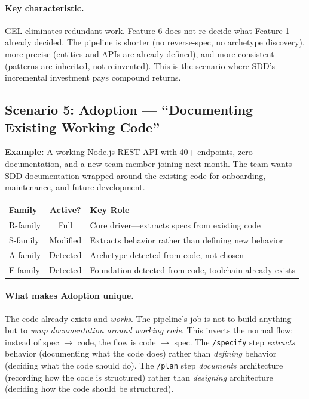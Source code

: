 \documentclass[11pt,a4paper,openright,twoside]{report}
\newcommand{\cmd}[1]{\texttt{/#1}}
\begin{document}
\paragraph{Key characteristic.}
GEL eliminates redundant work. Feature 6 does not re-decide what Feature 1 already decided. The pipeline is shorter (no reverse-spec, no archetype discovery), more precise (entities and APIs are already defined), and more consistent (patterns are inherited, not reinvented). This is the scenario where SDD's incremental investment pays compound returns.

\subsection{Scenario 5: Adoption --- ``Documenting Existing Working Code''}
\label{sec:scenario-adoption}

\textbf{Example:} A working Node.js REST API with 40+ endpoints, zero documentation, and a new team member joining next month. The team wants SDD documentation wrapped around the existing code for onboarding, maintenance, and future development.

\begin{center}
\begin{tabular}{lcp{8cm}}
\toprule
\textbf{Family} & \textbf{Active?} & \textbf{Key Role} \\
\midrule
R-family & Full & Core driver---extracts specs from existing code \\
S-family & Modified & Extracts behavior rather than defining new behavior \\
A-family & Detected & Archetype detected from code, not chosen \\
F-family & Detected & Foundation detected from code, toolchain already exists \\
\bottomrule
\end{tabular}
\end{center}

\paragraph{What makes Adoption unique.}
The code already exists and \emph{works}. The pipeline's job is not to build anything but to \emph{wrap documentation around working code}. This inverts the normal flow: instead of spec $\to$ code, the flow is code $\to$ spec. The \cmd{specify} step \emph{extracts} behavior (documenting what the code does) rather than \emph{defining} behavior (deciding what the code should do). The \cmd{plan} step \emph{documents} architecture (recording how the code is structured) rather than \emph{designing} architecture (deciding how the code should be structured).
\end{document}
